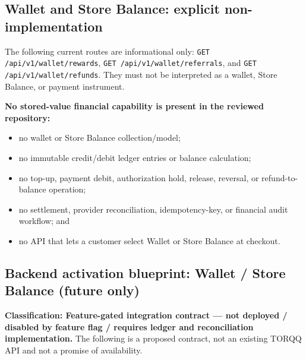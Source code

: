 \documentclass[11pt,a4paper]{article}
\newcommand{\code}[1]{\texttt{#1}}
\begin{document}
\subsection{Wallet and Store Balance: explicit non-implementation}
The following current routes are informational only: \code{GET /api/v1/wallet/rewards}, \code{GET /api/v1/wallet/referrals}, and \code{GET /api/v1/wallet/refunds}. They must not be interpreted as a wallet, Store Balance, or payment instrument.

\textbf{No stored-value financial capability is present in the reviewed repository:}
\begin{itemize}
  \item no wallet or Store Balance collection/model;
  \item no immutable credit/debit ledger entries or balance calculation;
  \item no top-up, payment debit, authorization hold, release, reversal, or refund-to-balance operation;
  \item no settlement, provider reconciliation, idempotency-key, or financial audit workflow; and
  \item no API that lets a customer select Wallet or Store Balance at checkout.
\end{itemize}

\subsection{Backend activation blueprint: Wallet / Store Balance (future only)}
\textbf{Classification: Feature-gated integration contract --- not deployed / disabled by feature flag / requires ledger and reconciliation implementation.} The following is a proposed contract, not an existing TORQQ API and not a promise of availability.
\end{document}
